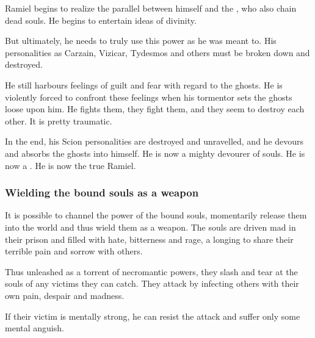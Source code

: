 Ramiel begins to realize the parallel between himself and the \Sephiroth, who also chain dead souls. He begins to entertain ideas of divinity. 

But ultimately, he needs to truly use this power as he was meant to. 
His personalities as Carzain, Vizicar, Tydesmos and others must be broken down and destroyed. 

He still harbours feelings of guilt and fear with regard to the ghosts. 
He is violently forced to confront these feelings when his tormentor sets the ghosts loose upon him. 
He fights them, they fight them, and they seem to destroy each other. 
It is pretty traumatic. 

In the end, his Scion personalities are destroyed and unravelled, and he devours and absorbs the ghosts into himself. 
He is now a mighty devourer of souls. 
He is now a \Malach. 
He is now the true Ramiel. 






\subsubsection{Wielding the bound souls as a weapon}
It is possible to channel the power of the bound souls, momentarily release them into the world and thus wield them as a weapon. The souls are driven mad in their prison and filled with hate, bitterness and rage, a longing to share their terrible pain and sorrow with others. 

Thus unleashed as a torrent of necromantic powers, they slash and tear at the souls of any victims they can catch. They attack by infecting others with their own pain, despair and madness.

If their victim is mentally strong, he can resist the attack and suffer only some mental anguish. 

